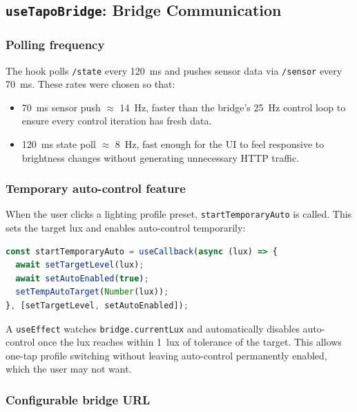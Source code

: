 \documentclass[12pt,letterpaper]{article}
\begin{document}
\subsection{\texttt{useTapoBridge}: Bridge Communication}

\subsubsection{Polling frequency}

The hook polls \texttt{/state} every 120~ms and pushes sensor data via
\texttt{/sensor} every 70~ms. These rates were chosen so that:

\begin{itemize}
  \item 70~ms sensor push $\approx$ 14~Hz, faster than the bridge's 25~Hz
        control loop to ensure every control iteration has fresh data.
  \item 120~ms state poll $\approx$ 8~Hz, fast enough for the UI to feel
        responsive to brightness changes without generating unnecessary HTTP
        traffic.
\end{itemize}

\subsubsection{Temporary auto-control feature}

When the user clicks a lighting profile preset, \texttt{startTemporaryAuto}
is called. This sets the target lux and enables auto-control temporarily:

\begin{lstlisting}[language=JavaScript, caption={Temporary auto-control}]
const startTemporaryAuto = useCallback(async (lux) => {
  await setTargetLevel(lux);
  await setAutoEnabled(true);
  setTempAutoTarget(Number(lux));
}, [setTargetLevel, setAutoEnabled]);
\end{lstlisting}

A \texttt{useEffect} watches \texttt{bridge.currentLux} and automatically
disables auto-control once the lux reaches within 1~lux of tolerance of the
target. This allows one-tap profile switching without leaving auto-control
permanently enabled, which the user may not want.

\subsubsection{Configurable bridge URL}
\end{document}
